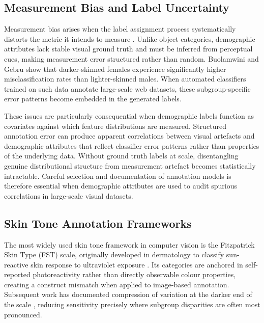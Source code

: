\subsection{Measurement Bias and Label Uncertainty}
\label{subsec:measurement_bias}

Measurement bias arises when the label assignment process systematically distorts the metric it intends to measure \cite{Mehrabi_2022_SurveyBiasFairnessMachine}. Unlike object categories, demographic attributes lack stable visual ground truth and must be inferred from perceptual cues, making measurement error structured rather than random. Buolamwini and Gebru \cite{Buolamwini_2018_GenderShades} show that darker-skinned females experience significantly higher misclassification rates than lighter-skinned males. When automated classifiers trained on such data annotate large-scale web datasets, these subgroup-specific error patterns become embedded in the generated labels.

These issues are particularly consequential when demographic labels function as covariates against which feature distributions are measured. Structured annotation error can produce apparent correlations between visual artefacts and demographic attributes that reflect classifier error patterns rather than properties of the underlying data. Without ground truth labels at scale, disentangling genuine distributional structure from measurement artefact becomes statistically intractable. Careful selection and documentation of annotation models is therefore essential when demographic attributes are used to audit spurious correlations in large-scale visual datasets.

\subsection{Skin Tone Annotation Frameworks}
\label{subsec:skin_tone_frameworks}

The most widely used skin tone framework in computer vision is the Fitzpatrick Skin Type (FST) scale, originally developed in dermatology to classify sun-reactive skin response to ultraviolet exposure \cite{Fitzpatrick_1988_SkinTypes}. Its categories are anchored in self-reported photoreactivity rather than directly observable colour properties, creating a construct mismatch when applied to image-based annotation. Subsequent work has documented compression of variation at the darker end of the scale \cite{Groh_2021_Fitzpatrick17k}, reducing sensitivity precisely where subgroup disparities are often most pronounced.

